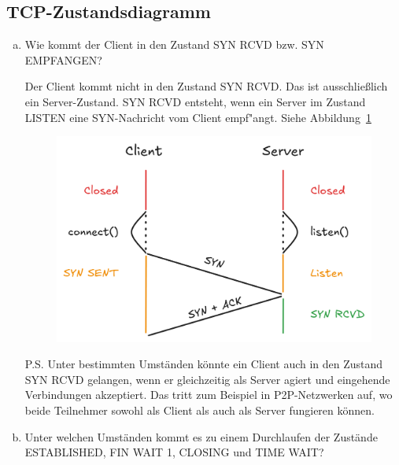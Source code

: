 \setcounter{section}{5}
\setcounter{subsection}{10} %
\subsection{TCP-Zustandsdiagramm}

\begin{enumerate}[(a)]
    \item Wie kommt der Client in den Zustand {\ttfamily SYN RCVD} bzw. {\ttfamily SYN EMPFANGEN}?

        Der Client kommt nicht in den Zustand {\ttfamily SYN RCVD}. Das ist
        ausschlie{\ss}lich ein Server-Zustand. {\ttfamily SYN RCVD} entsteht,
        wenn ein Server im Zustand {\ttfamily LISTEN} eine {\ttfamily
        SYN}-Nachricht vom Client empf"angt. Siehe Abbildung~\ref{fig:5.11.a}

        \begin{figure}[p]
            \centering
            \includegraphics[width=1\textwidth]{./assets/5.11.a.png}
            \caption{}
            \label{fig:5.11.a}
        \end{figure}

        P.S. Unter bestimmten Umständen könnte ein Client auch in den Zustand
        {\ttfamily SYN RCVD} gelangen, wenn er gleichzeitig als Server agiert
        und eingehende Verbindungen akzeptiert. Das tritt zum Beispiel in
        {\ttfamily P2P}-Netzwerken auf, wo beide Teilnehmer sowohl als Client
        als auch als Server fungieren können.

    \item Unter welchen Umständen kommt es zu einem Durchlaufen der Zustände
        {\ttfamily ESTABLISHED}, {\ttfamily FIN WAIT 1}, {\ttfamily CLOSING}
        und {\ttfamily TIME WAIT}?


\end{enumerate}
